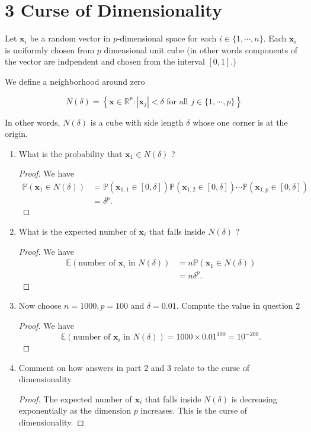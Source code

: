 \documentclass[10pt]{article}
\begin{document}
\section*{3 Curse of Dimensionality}
Let $\mathbf{x}_{i}$ be a random vector in $p$-dimensional space for each $i \in\{1, \cdots, n\}$. Each $\mathbf{x}_{i}$ is uniformly chosen from $p$ dimensional unit cube (in other words components of the vector are indpendent and chosen from the interval $[0,1]$.)

We define a neighborhood around zero

$$
N(\delta)=\left\{\mathbf{x} \in \mathbb{R}^{p}:\left|\mathbf{x}_{j}\right|<\delta \text { for all } j \in\{1, \cdots, p\}\right\}
$$

In other words, $N(\delta)$ is a cube with side length $\delta$ whose one corner is at the origin.

\begin{enumerate}
  \item What is the probability that $\mathbf{x}_{1} \in N(\delta)$ ?
    \begin{proof}
        We have
        \begin{align*}
            \mathbb{P}(\mathbf{x}_{1} \in N(\delta))&=\mathbb{P}(\mathbf{x}_{1,1} \in [0,\delta])\mathbb{P}(\mathbf{x}_{1,2} \in [0,\delta])\cdots \mathbb{P}(\mathbf{x}_{1,p} \in [0,\delta])\\
            &=\delta^p.
        \end{align*}
    \end{proof}
  \item What is the expected number of $\mathbf{x}_{i}$ that falls inside $N(\delta)$ ?
    \begin{proof}
        We have
        \begin{align*}
            \mathbb{E}(\text{number of }\mathbf{x}_{i} \text{ in } N(\delta))&=n\mathbb{P}(\mathbf{x}_{1} \in N(\delta))\\
            &=n\delta^p.
        \end{align*}
    \end{proof}
  \item Now choose $n=1000, p=100$ and $\delta=0.01$. Compute the value in question 2
    \begin{proof}
        We have
        \[\mathbb{E}(\text{number of }\mathbf{x}_{i} \text{ in } N(\delta))=1000\times 0.01^{100}=10^{-200}.\]
    \end{proof}
  \item Comment on how answers in part 2 and 3 relate to the curse of dimensionality.
    \begin{proof}
        The expected number of $\mathbf{x}_{i}$ that falls inside $N(\delta)$ is decreasing exponentially as the dimension $p$ increases. This is the curse of dimensionality.
    \end{proof}
\end{enumerate}
\end{document}
